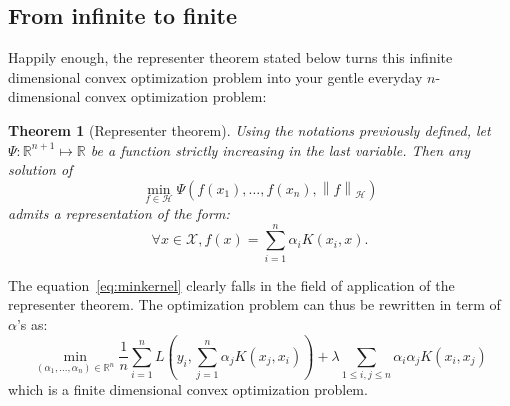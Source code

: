 \documentclass[a4paper, 11pt]{article}
\newtheorem{theorem}{Theorem}
\newcommand{\X}{\mathcal{X}}
\newcommand{\R}{\mathbb{R}}
\newcommand{\Hilb}{\mathcal{H}}
\newcommand{\x}{x_i}
\newcommand{\y}{y_i}
\newcommand{\normh}[1]{\left\| #1 \right\|_\Hilb}
\begin{document}
\subsection{From infinite to finite}
Happily enough, the representer theorem stated below turns this infinite dimensional convex optimization
problem into your gentle everyday $n$-dimensional convex optimization problem:
\begin{theorem}[Representer theorem]
  Using the notations previously defined, let $\Psi:\R^{n+1}\mapsto\R$ be a function strictly increasing in 
  the last variable. Then any solution of
  \begin{equation}
    \min\limits_{f\in\Hilb}\Psi(f(x_1), \dots, f(x_n), \normh{f})
  \end{equation}
  admits a representation of the form:
  \begin{equation}
    \forall x \in \X, f(x) = \sum\limits_{i=1}^n\alpha_iK(\x,x).
  \end{equation}
\end{theorem}
The equation~\ref{eq:minkernel} clearly falls in the field of application of the representer theorem.
The optimization problem can thus be rewritten in term of $\alpha$'s as:
\begin{equation}
  \min\limits_{(\alpha_1, \dots, \alpha_n)\in\R^n} 
  \frac{1}{n}\sum\limits_{i=1}^nL(\y, \sum\limits_{j=1}^n\alpha_jK(x_j, x_i)) +
  \lambda\sum\limits_{1\leq i,j\leq n}\alpha_i\alpha_j K(\x, x_j)
\end{equation}
which is a finite dimensional convex optimization problem.
\end{document}
